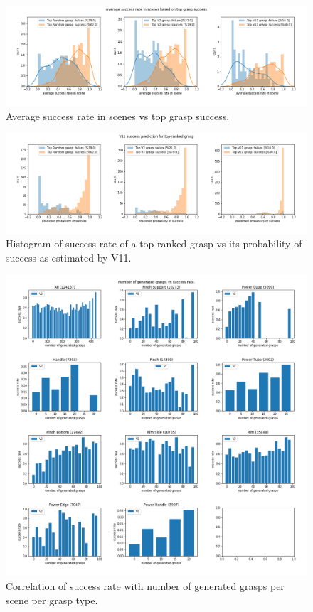 \begin{figure}
\centering
\includegraphics[width=0.8\columnwidth]{images/post-analysis/[7] Average_success_rate_in_scenes_based_on_top_grasp_success.png}
\caption{Average success rate in scenes vs top grasp success.}
\label{fig:post7}
\end{figure}

\begin{figure}
\centering
\includegraphics[width=0.8\columnwidth]{images/post-analysis/[8] V11_success_prediction_for_top-ranked_grasp.png}
\caption{Histogram of success rate of a top-ranked grasp vs its probability of success as estimated by V11.}
\label{fig:post8}
\end{figure}

\begin{figure}
\centering
\includegraphics[width=0.8\columnwidth]{images/post-analysis/[10] number_of_generated_grasps_vs_success_rate.png}
\caption{Correlation of success rate with number of generated grasps per scene per grasp type.}
\label{fig:post10}
\end{figure}

